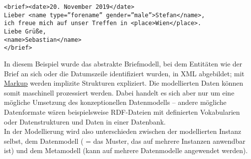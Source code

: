 \documentclass{article}
\begin{document}
        \begin{verbatim}<brief><date>20. November 2019</date>
Lieber <name type=”forename” gender=”male”>Stefan</name>, 
ich freue mich auf unser Treffen in <place>Wien</place>.
Liebe Grüße,
<name>Sebastian</name>
</brief>\end{verbatim}In diesem Beispiel wurde das abstrakte Briefmodell, bei dem Entitäten wie der
                  Brief an sich oder die Datumszeile identifiziert wurden, in XML abgebildet; mit
                     \href{http://gams.uni-graz.at/o:konde.126}{Markup} werden implizite
                  Strukturen expliziert. Die modellierten Daten können somit maschinell prozessiert
                  werden. Dabei handelt es sich aber nur um eine mögliche Umsetzung des
                  konzeptionellen Datenmodells – andere mögliche Datenformate wären beispielsweise
                  RDF-Dateien mit definierten Vokabularien oder Datenstrukturen und Daten in einer
                  Datenbank.\\
            
        In der Modellierung wird also unterschieden zwischen der modellierten Instanz
                  selbst, dem Datenmodell ( = das Muster, das auf mehrere Instanzen anwendbar ist)
                  und dem Metamodell (kann auf mehrere Datenmodelle angewendet werden).\\
            
\end{document}
